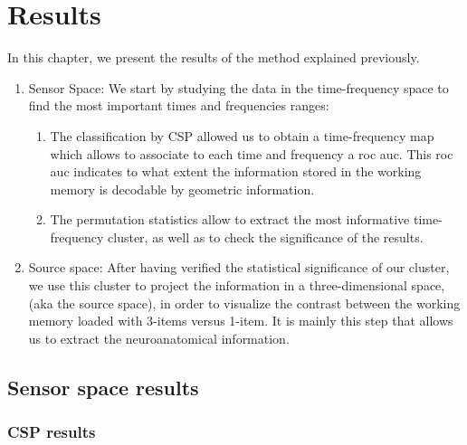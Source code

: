 \chapter{Results}

In this chapter, we present the results of the method explained previously.

\begin{enumerate}
    \item Sensor Space: We start by studying the data in the time-frequency space to find the most important times and frequencies ranges:
          \begin{enumerate}
              \item The classification by CSP allowed us to obtain a time-frequency map which allows to associate to each time and frequency a roc auc. This roc auc indicates to what extent the information stored in the working memory is decodable by geometric information.
              \item The permutation statistics allow to extract the most informative time-frequency cluster, as well as to check the significance of the results.
          \end{enumerate}

    \item Source space: After having verified the statistical significance of our cluster, we use this cluster to project the information in a three-dimensional space, (aka the source space), in order to visualize the contrast between the working memory loaded with 3-items versus 1-item. It is mainly this step that allows us to extract the neuroanatomical information.
\end{enumerate}

\section{Sensor space results}

\subsection{CSP results}


